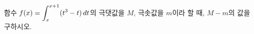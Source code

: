 함수 $f(x)=\displaystyle\int_{x}^{x+1}(t^3-t)\mkern3mu dt$의 극댓값을 $M$, 극솟값을 $m$이라 할 때, $M-m$의 값을 구하시오.
